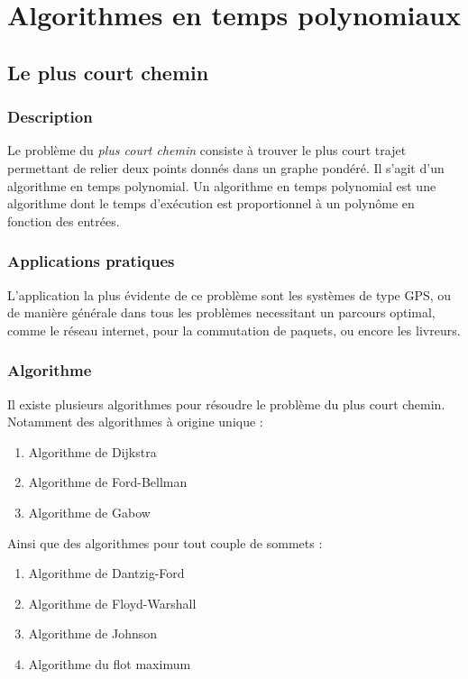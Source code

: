 \section{Algorithmes en temps polynomiaux}
    \subsection{Le plus court chemin}
        \subsubsection{Description}
        Le problème du \emph{plus court chemin} consiste à trouver
        le plus court trajet permettant de relier deux points donnés dans un graphe pondéré. 
	Il s'agit d'un algorithme en temps polynomial. Un algorithme en temps polynomial est 
	une algorithme dont le temps d'exécution est proportionnel à un polynôme en fonction des entrées.
	
        \subsubsection{Applications pratiques}
            L'application la plus évidente de ce problème sont les systèmes de type
            GPS, ou de manière générale dans tous les problèmes necessitant
            un parcours optimal, comme le réseau internet, pour la commutation de
            paquets, ou encore les livreurs.
        \subsubsection{Algorithme} %
	Il existe plusieurs algorithmes pour résoudre le problème du plus court chemin. 
	Notamment des algorithmes à origine unique :
\begin{enumerate}
 \item Algorithme de Dijkstra
 \item Algorithme de Ford-Bellman
 \item Algorithme de Gabow
\end{enumerate}
	Ainsi que des algorithmes pour tout couple de sommets :
\begin{enumerate}
 \item Algorithme de Dantzig-Ford
 \item Algorithme de Floyd-Warshall
 \item Algorithme de Johnson
 \item Algorithme du flot maximum
\end{enumerate}

